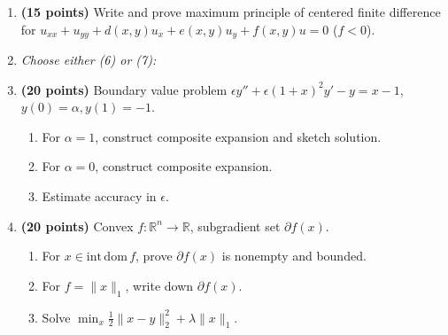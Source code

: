 \documentclass[11pt,a4paper]{article}
\begin{document}
\begin{enumerate}[label=\textbf{(\arabic*)}]
    \item \textbf{(15 points)} Write and prove maximum principle of centered finite difference for $u_{xx} + u_{yy} + d(x,y)u_x + e(x,y)u_y + f(x,y)u = 0$ ($f < 0$).

    \item[] \textit{Choose either (6) or (7):}

    \item \textbf{(20 points)} Boundary value problem $\epsilon y'' + \epsilon(1+x)^2 y' - y = x - 1$, $y(0) = \alpha, y(1) = -1$.
    \begin{enumerate}[label=(\roman*)]
        \item For $\alpha = 1$, construct composite expansion and sketch solution.
        \item For $\alpha = 0$, construct composite expansion.
        \item Estimate accuracy in $\epsilon$.
    \end{enumerate}

    \item \textbf{(20 points)} Convex $f : \mathbb{R}^n \to \mathbb{R}$, subgradient set $\partial f(x)$.
    \begin{enumerate}[label=(\roman*)]
        \item For $x \in \mathrm{int\,dom}\,f$, prove $\partial f(x)$ is nonempty and bounded.
        \item For $f = \|x\|_1$, write down $\partial f(x)$.
        \item Solve $\min_x \frac{1}{2}\|x - y\|_2^2 + \lambda \|x\|_1$.
    \end{enumerate}
\end{enumerate}
\end{document}
